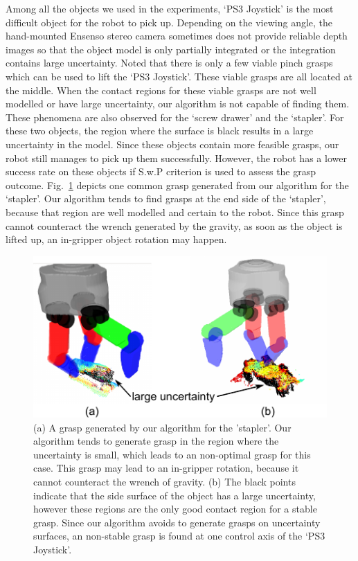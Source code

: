 Among all the objects we used in the experiments, `PS3 Joystick' is the most difficult object for the robot to pick up. Depending on the viewing angle, the hand-mounted Ensenso stereo camera sometimes does not provide reliable depth images so that the object model is only partially integrated or the integration contains large uncertainty. Noted that there is only a few viable pinch grasps which can be used to lift the `PS3 Joystick'. These viable grasps are all located at the middle. When the contact regions for these viable grasps are not well modelled or have large uncertainty, our algorithm is not capable of finding them. These phenomena are also observed for the `screw drawer' and the `stapler'. For these two objects, the region where the surface is black results in a large uncertainty in the model. Since these objects contain more feasible grasps, our robot still manages to pick up them successfully. However, the robot has a lower success rate on these objects if S.w.P criterion is used to assess the grasp outcome. Fig.~\ref{fig:slip_staple} depicts one common grasp generated from our algorithm for the `stapler'. Our algorithm tends to find grasps at the end side  of the `stapler', because that region are well modelled and certain to the robot. Since this grasp cannot counteract the wrench generated by the gravity, as soon as the object is lifted up, an in-gripper  object rotation may happen.   

\begin{figure}[!htpb]
\centering
\includegraphics[width=0.7\linewidth]{figure/non_optimal_grasp.pdf}
\caption{(a) A grasp generated by our algorithm for the 'stapler'. Our algorithm tends to generate grasp in the region where the uncertainty is small, which leads to an non-optimal grasp for this case. This grasp may lead to an in-gripper rotation, because it cannot counteract the wrench of gravity. (b) The black points indicate that the side surface of the object has a large uncertainty, however these regions are the only good contact region for a stable grasp. Since our algorithm avoids to generate grasps on uncertainty surfaces, an non-stable grasp is found at one control axis of the `PS3 Joystick'.}
\label{fig:slip_staple} 
\end{figure}

